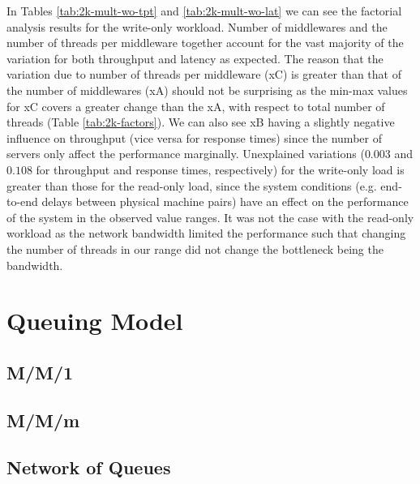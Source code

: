 \documentclass[11pt,a4paper]{article}
\begin{document}
\par In Tables \ref{tab:2k-mult-wo-tpt} and \ref{tab:2k-mult-wo-lat} we can see the factorial analysis results for the write-only workload. Number of middlewares and the number of threads per middleware together account for the vast majority of the variation for both throughput and latency as expected. The reason that the variation due to number of threads per middleware (xC) is greater than that of the number of middlewares (xA) should not be surprising as the min-max values for xC covers a greater change than the xA, with respect to total number of threads (Table \ref{tab:2k-factors}). We can also see xB having a slightly negative influence on throughput (vice versa for response times) since the number of servers only affect the performance marginally. Unexplained variations ($0.003$ and $0.108$ for throughput and response times, respectively) for the write-only load is greater than those for the read-only load, since the system conditions (e.g. end-to-end delays between physical machine pairs) have an effect on the performance of the system in the observed value ranges. It was not the case with the read-only workload as the network bandwidth limited the performance such that changing the number of threads in our range did not change the bottleneck being the bandwidth.

\section{Queuing Model} \label{sec:queueing-model}

\subsection{M/M/1} \label{sec:mm1}

\subsection{M/M/m} \label{sec:mmm}

\subsection{Network of Queues} \label{sec:network-of-queues}

\clearpage
\end{document}
